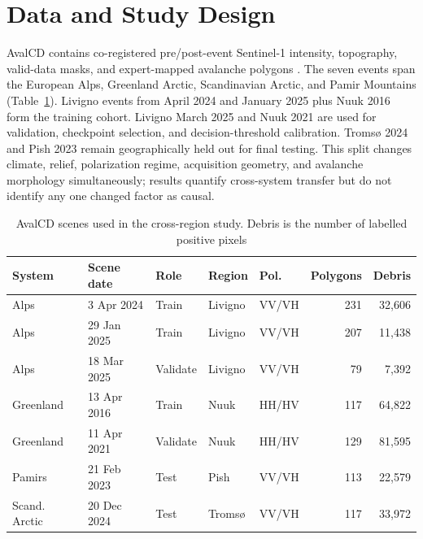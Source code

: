 \documentclass[referee,lineno,pdflatex,sn-apa]{sn-jnl}
\begin{document}
\section{Data and Study Design}

AvalCD contains co-registered pre/post-event Sentinel-1 intensity, topography, valid-data masks, and expert-mapped avalanche polygons \citep{gatti2026avalanche,avalcd_dataset}. The seven events span the European Alps, Greenland Arctic, Scandinavian Arctic, and Pamir Mountains (Table~\ref{tab:data}). Livigno events from April 2024 and January 2025 plus Nuuk 2016 form the training cohort. Livigno March 2025 and Nuuk 2021 are used for validation, checkpoint selection, and decision-threshold calibration. Troms{\o} 2024 and Pish 2023 remain geographically held out for final testing. This split changes climate, relief, polarization regime, acquisition geometry, and avalanche morphology simultaneously; results quantify cross-system transfer but do not identify any one changed factor as causal.

\begin{table}[t]
\caption{AvalCD scenes used in the cross-region study. Debris is the number of labelled positive pixels}
\label{tab:data}
\centering
\scriptsize
\begin{tabular}{lllllrr}
\toprule
System & Scene date & Role & Region & Pol. & Polygons & Debris \\
\midrule
Alps & 3 Apr 2024 & Train & Livigno & VV/VH & 231 & 32,606 \\
Alps & 29 Jan 2025 & Train & Livigno & VV/VH & 207 & 11,438 \\
Alps & 18 Mar 2025 & Validate & Livigno & VV/VH & 79 & 7,392 \\
Greenland & 13 Apr 2016 & Train & Nuuk & HH/HV & 117 & 64,822 \\
Greenland & 11 Apr 2021 & Validate & Nuuk & HH/HV & 129 & 81,595 \\
Pamirs & 21 Feb 2023 & Test & Pish & VV/VH & 113 & 22,579 \\
Scand. Arctic & 20 Dec 2024 & Test & Troms{\o} & VV/VH & 117 & 33,972 \\
\bottomrule
\end{tabular}
\end{table}
\end{document}
